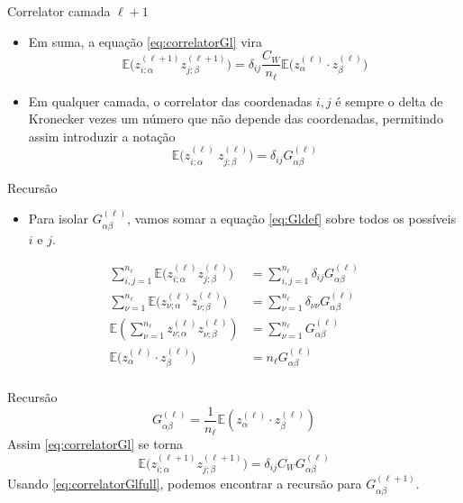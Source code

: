 \documentclass{beamer}
\newcommand{\EE}{\mathbb{E}}
\newcommand{\aaA}{\alpha}
\newcommand{\aaB}{\beta}
\def\eell{{(\ell)}}
\def\eellum{{(\ell+1)}}
\begin{document}
\begin{frame}{Correlator camada $\ell +1$}
	\begin{itemize}
		\item Em suma, a equação \eqref{eq:correlatorGl} vira 
		 \begin{equation*}
			\EE\big(z^\eellum_{i;\aaA} z^\eellum_{j;\aaB}\big) = \delta_{ij}\frac{C_W}{n_\ell} \EE\big(z^\eell_{\aaA}\cdot  z^\eell_{\aaB}\big)\tag{3.11}
		 \end{equation*}
		 \item Em qualquer camada, o correlator das coordenadas $i,j$ é sempre o delta de Kronecker vezes um número que não depende das coordenadas, permitindo assim introduzir a notação 
		 \begin{equation*}\tag{3.12}\label{eq:Gldef}
			\EE\big(z^\eell_{i;\aaA}\ z^\eell_{j;\aaB}\big) = \delta_{ij} G^\eell_{\aaA\aaB}  
		 \end{equation*}
	\end{itemize}
\end{frame}

\begin{frame}{Recursão}
	\begin{itemize}
		\item Para isolar $G^\eell_{\aaA\aaB}$, vamos somar a equação \eqref{eq:Gldef} sobre todos os possíveis $i$ e $j$.
	\end{itemize}
	\begin{align*}
		\sum_{i,j=1}^{n_\ell} \EE\big(z^\eell_{i;\aaA} z^\eell_{j;\aaB}\big) &= \sum_{i,j=1}^{n_\ell} \delta_{ij} G^\eell_{\aaA\aaB} \\
		\sum_{\nu=1}^{n_\ell} \EE\big(z^\eell_{\nu;\aaA} z^\eell_{\nu;\aaB}\big) &= \sum_{\nu=1}^{n_\ell} \delta_{\nu\nu}G^\eell_{\aaA\aaB} \\
		\EE\left(\sum_{\nu=1}^{n_\ell}z^\eell_{\nu;\aaA} z^\eell_{\nu;\aaB}\right) &= \sum_{\nu=1}^{n_\ell} G^\eell_{\aaA\aaB} \\
		\EE\big(z^\eell_{\aaA}\cdot z^\eell_{\aaB}\big) &= n_\ell G^\eell_{\aaA\aaB} \\
	\end{align*}
\end{frame}

\begin{frame}{Recursão}
	\begin{equation*}\tag{3.13}\label{eq:Gl}
		G^\eell_{\aaA\aaB} = \frac{1}{n_\ell}\EE(z^\eell_{\aaA}\cdot z^\eell_{\aaB})		
	\end{equation*}
	Assim \eqref{eq:correlatorGl} se torna
	\begin{equation*}\tag{3.11'}\label{eq:correlatorGlfull}
		\EE\big(z^\eellum_{i;\aaA} z^\eellum_{j;\aaB}\big) = \delta_{ij}C_WG^\eell_{\aaA\aaB}
	\end{equation*}
	Usando \eqref{eq:correlatorGlfull}, podemos encontrar a recursão para $G^\eellum_{\aaA\aaB}$.
\end{frame}
\end{document}
